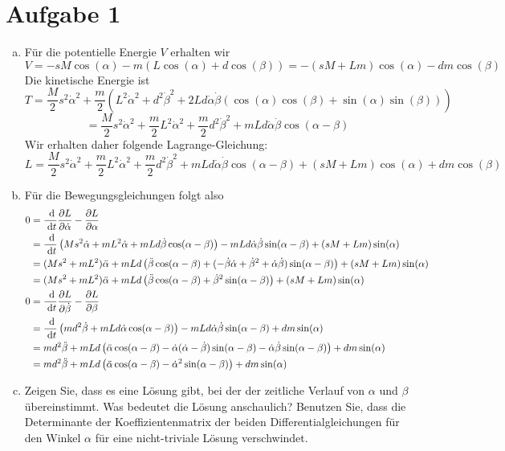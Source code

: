 \documentclass{article}
\theoremstyle{definition}
\begin{document}
\section*{Aufgabe 1}
\begin{enumerate}[(a)]
    \item Für die potentielle Energie $V$ erhalten wir
    $$V  = -s M \cos(\alpha) - m (L \cos(\alpha) + d\cos(\beta)) = -(sM + Lm)\cos(\alpha) - dm\cos(\beta)$$
    Die kinetische Energie ist
    $$T = \frac{M}{2}s^2\dot \alpha^2 + \frac{m}{2}\left(L^2\dot \alpha^2 + d^2\dot \beta^2 + 2Ld\dot \alpha\dot \beta (\cos(\alpha)\cos(\beta) + \sin(\alpha)\sin(\beta))\right)$$
    $$= \frac{M}{2}s^2\dot \alpha^2 + \frac{m}{2}L^2 \dot \alpha^2 + \frac{m}{2}d^2 \dot \beta^2 + mLd\dot \alpha\dot \beta \cos(\alpha - \beta)$$
    Wir erhalten daher folgende Lagrange-Gleichung:
    $$L = \frac{M}{2}s^2\dot \alpha^2 + \frac{m}{2}L^2 \dot \alpha^2 + \frac{m}{2}d^2 \dot \beta^2 + mLd\dot \alpha\dot \beta \cos(\alpha - \beta)+(sM + Lm)\cos(\alpha) + dm\cos(\beta)$$
    \item Für die Bewegungsgleichungen folgt also
    \begin{align*}
        0 &= \frac{\d }{\d t}\frac{\partial L }{\partial \dot \alpha} - \frac{\partial L}{\partial \alpha}\\
        &= \frac{\d }{\d t} \left(Ms^2 \dot \alpha + mL^2 \dot \alpha + mLd\dot \beta \cos(\alpha - \beta)\right) - mLd\dot \alpha\dot \beta \sin(\alpha - \beta)+ (sM + Lm)\sin(\alpha)\\
        &= (Ms^2 + mL^2)\ddot \alpha + mLd\left(\ddot \beta\cos(\alpha - \beta) + (- \dot \beta \dot \alpha + \dot \beta^2+ \dot\alpha \dot \beta) \sin(\alpha - \beta)\right)+ (sM + Lm)\sin(\alpha)\\
        &= (Ms^2 + mL^2)\ddot \alpha + mLd\left(\ddot \beta\cos(\alpha - \beta) + \dot \beta^2 \sin(\alpha - \beta)\right)+ (sM + Lm)\sin(\alpha)\\
        0 &= \frac{\d }{\d t}\frac{\partial L }{\partial \dot \beta} - \frac{\partial L}{\partial \beta}\\
        &= \frac{\d }{\d t} \left(md^2\dot \beta + mLd\dot \alpha \cos(\alpha - \beta)\right) - mLd\dot \alpha\dot \beta \sin(\alpha - \beta) + dm\sin(\alpha)\\
        &= md^2 \ddot \beta + mLd\left(\ddot \alpha \cos(\alpha - \beta) - \dot \alpha (\dot \alpha - \dot \beta)\sin(\alpha - \beta) - \dot \alpha \dot \beta \sin(\alpha - \beta)\right)+ dm\sin(\alpha)\\
        &= md^2 \ddot \beta + mLd\left(\ddot \alpha \cos(\alpha - \beta) - \dot \alpha^2 \sin(\alpha - \beta)\right)+ dm\sin(\alpha)\\
    \end{align*}
    \item Zeigen Sie, dass es eine Lösung gibt, bei der der zeitliche Verlauf von $\alpha$ und $\beta$ übereinstimmt.
    Was bedeutet die Lösung anschaulich? Benutzen Sie, dass die Determinante der Koeffizientenmatrix der beiden Differentialgleichungen für den Winkel $\alpha$ für eine nicht-triviale Lösung verschwindet.
    
\end{enumerate}
\end{document}
